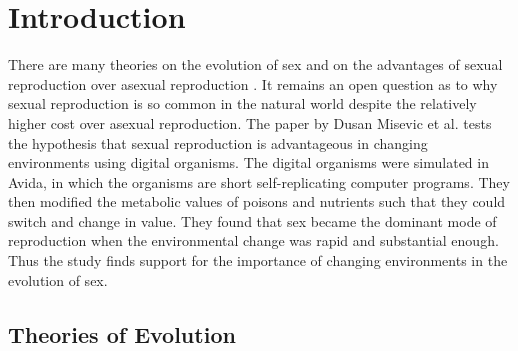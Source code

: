 \section{Introduction}

There are many theories on the evolution of sex and on the advantages of sexual reproduction over asexual reproduction \cite{misevic, michod1988evolution}. 
It remains an open question as to why sexual reproduction is so common in the natural world despite the relatively higher cost over asexual reproduction. 
The paper by Dusan Misevic et al. \cite{misevicchanging} tests the hypothesis that sexual reproduction is advantageous in changing environments using digital organisms. 
The digital organisms were simulated in Avida, in which the organisms are short self-replicating computer programs. 
They then modified the metabolic values of poisons and nutrients such that they could switch and change in value. 
They found that sex became the dominant mode of reproduction when the environmental change was rapid and substantial enough. 
Thus the study finds support for the importance of changing environments in the evolution of sex. 

\subsection{Theories of Evolution}

